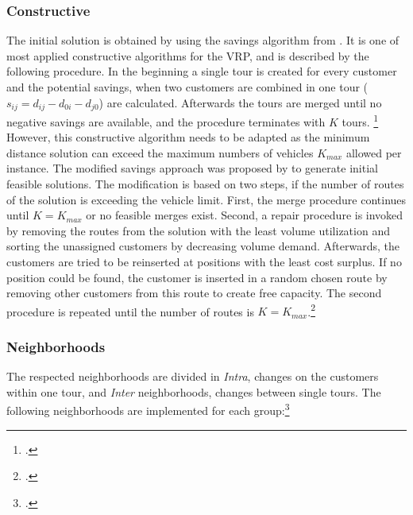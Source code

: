 \subsubsection{Constructive}
The initial solution is obtained by using the savings algorithm from \cite{clarke_scheduling_1964}. It is one of
most applied constructive algorithms for the \gls{VRP}, and is described by the following procedure. In the beginning
a single tour is created for every customer and the potential savings, when two customers are combined in one tour
($s_{ij} = d_{ij} - d_{0i} - d_{j0}$) are calculated.
Afterwards the tours are merged until no negative savings are available, and the
procedure terminates with $K$ tours. \footcite[cf.][]{clarke_scheduling_1964} However, this constructive algorithm needs to be adapted
as the minimum distance solution can exceed the maximum numbers of vehicles $K_{max}$ allowed per instance.
The modified savings approach was proposed by \cite{zhang_evolutionary_2015} to generate initial feasible solutions.
The modification is based on two steps, if the number of routes of the solution is exceeding the vehicle limit. First,
the merge procedure continues until $K = K_{max}$ or no feasible merges exist. Second, a repair procedure is invoked
by removing the routes from the solution with the least volume utilization and sorting the unassigned customers by
decreasing volume demand. Afterwards, the customers are tried to be reinserted at positions with the least
cost surplus. If no position could be found, the customer is inserted in a random chosen route by removing
other customers from this route to create free capacity. The second procedure is repeated until the
number of routes is $K = K_{max}$.\footcite[cf.][p. 24]{zhang_evolutionary_2015}

\subsubsection{Neighborhoods}
\label{sec:neighborhoods}

The respected neighborhoods are divided in \textit{Intra}, changes on the customers within one tour, and \textit{Inter} neighborhoods,
changes between single tours. The following neighborhoods are implemented for each group:\footcite[cf.][p. 89f]{toth_vehicle_2014}


